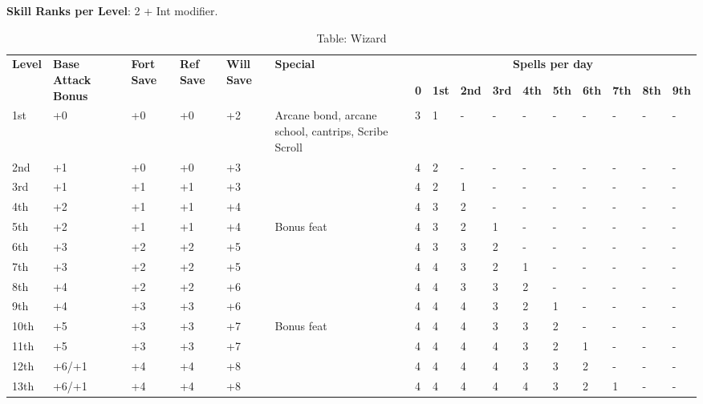 \textbf{Skill Ranks per Level}: 2 + Int modifier.

\begin{table*}[]
\caption{Table: Wizard}
\sffamily
\setlength{\tabcolsep}{1pt}
\begin{tabularx}{\linewidth}{lp{6em}p{2.5em}p{2.5em}p{2.5em}Xllllllllll}
\multirow{2}{*}{\textbf{Level}} & \multirow{2}{*}{\parbox{5em}{\textbf{Base Attack Bonus}}} & \multirow{2}{*}{\parbox{1.5em}{\textbf{Fort Save}}} & \multirow{2}{*}{\parbox{1.5em}{\textbf{Ref Save}}} & \multirow{2}{*}{\parbox{1.5em}{\textbf{Will Save}}} & \textbf{Special}     & \multicolumn{10}{c}{\textbf{Spells per day}} \\
                       &                                    &                            &                           &                            &                                                                                                  &  \textbf{0} & \textbf{1st} & \textbf{2nd} & \textbf{3rd} & \textbf{4th} & \textbf{5th} & \textbf{6th} & \textbf{7th} & \textbf{8th} & \textbf{9th} \\
1st & +0 & +0 & +0 & +2 & Arcane bond, arcane school, cantrips, Scribe Scroll & 3 & 1 & - & - & - & - & - & - & - & -\\
2nd & +1 & +0 & +0 & +3 &  & 4 & 2 & - & - & - & - & - & - & - & -\\
3rd & +1 & +1 & +1 & +3 &  & 4 & 2 & 1 & - & - & - & - & - & - & -\\
4th & +2 & +1 & +1 & +4 &  & 4 & 3 & 2 & - & - & - & - & - & - & -\\
5th & +2 & +1 & +1 & +4 & Bonus feat & 4 & 3 & 2 & 1 & - & - & - & - & - & -\\
6th & +3 & +2 & +2 & +5 &  & 4 & 3 & 3 & 2 & - & - & - & - & - & -\\
7th & +3 & +2 & +2 & +5 &  & 4 & 4 & 3 & 2 & 1 & - & - & - & - & -\\
8th & +4 & +2 & +2 & +6 &  & 4 & 4 & 3 & 3 & 2 & - & - & - & - & -\\
9th & +4 & +3 & +3 & +6 &  & 4 & 4 & 4 & 3 & 2 & 1 & - & - & - & -\\
10th & +5 & +3 & +3 & +7 & Bonus feat & 4 & 4 & 4 & 3 & 3 & 2 & - & - & - & -\\
11th & +5 & +3 & +3 & +7 &  & 4 & 4 & 4 & 4 & 3 & 2 & 1 & - & - & -\\
12th & +6/+1 & +4 & +4 & +8 &  & 4 & 4 & 4 & 4 & 3 & 3 & 2 & - & - & -\\
13th & +6/+1 & +4 & +4 & +8 &  & 4 & 4 & 4 & 4 & 4 & 3 & 2 & 1 & - & -\\

\end{tabularx}
\end{table*}
